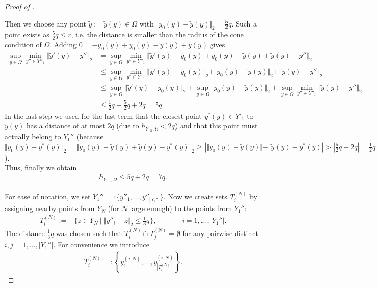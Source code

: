 \documentclass[a4paper, 10pt]{article}
\begin{document}
\begin{proof}[Proof of ]
\begin{itemize}
Then we choose any point $\tilde{y} := \tilde{y}(y) \in \Omega$ with $\Vert y_0(y) - \tilde{y}(y) \Vert_2 = \frac{5}{2} q$.
%
Such a point exists as $\frac{5}{2} q \leq r$, i.e. the distance is smaller than the radius of the cone condition of $\Omega$.
Adding $0 = - y_0(y) + y_0(y) - \tilde{y}(y) + \tilde{y}(y)$ gives
\begin{align*}
\sup_{y \in \Omega} \min_{y'' \in Y''_1}  \Vert \tilde{y}'(y) - y'' \Vert_2 
&= \sup_{y \in \Omega} \min_{y'' \in Y''_1}  \Vert \tilde{y}'(y) - y_0(y) + y_0(y) - \tilde{y}(y) + \tilde{y}(y) - y'' \Vert_2 \\
&\leq \sup_{y \in \Omega} \min_{y'' \in Y''_1}  \Vert \tilde{y}'(y) - y_0(y) \Vert_2 + \Vert y_0(y) - \tilde{y}(y) \Vert_2+ \Vert \tilde{y}(y) - y'' \Vert_2 \\
&\leq \sup_{y \in \Omega} \Vert \tilde{y}'(y) - y_0(y) \Vert_2 + \sup_{y \in \Omega} \Vert y_0(y) - \tilde{y}(y) \Vert_2 + \sup_{y \in \Omega} \min_{y'' \in Y''_1} \Vert \tilde{y}(y) - y'' \Vert_2 \\
&\leq \frac{1}{2} q + \frac{5}{2} q + 2q = 5q.
\end{align*}
In the last step we used for the last term that the closest point $y^*(y) \in Y'_1$ to $\tilde{y}(y)$ has a distance of at most $2q$ (due to $h_{Y'_1, \Omega} < 2q$) and that this point must actually belong to $Y_1''$ 
(because $\Vert y_0(y) - y^*(y) \Vert_2 = \Vert y_0(y) - \tilde{y}(y) + \tilde{y}(y) - y^*(y) \Vert_2 \geq \left| \Vert y_0(y) - \tilde{y}(y) \Vert - \Vert \tilde{y}(y) - y^*(y) \right| > |\frac{5}{2} q - 2q | = \frac{1}{2} q$). \\
Thus, finally we obtain
\begin{align*}
h_{Y_1'', \Omega} \leq 5q + 2q = 7q.
\end{align*}
\end{itemize}
For ease of notation, we set $Y_1'' =: \{y''_1, ..., y''_{|Y_1''|} \}$.
Now we create sets $T_i^{(N)}$ by assigning nearby points from $Y_N$ (for $N$ large enough) to the points from $Y_1''$:
\begin{align}
\label{eq:proof:definition_TiN}
T_i^{(N)} :=& \{ z \in Y_N ~ | ~ \Vert y''_i - z \Vert_2 \leq \frac{1}{3} q \}, \qquad &&i=1, ..., |Y_1''|.
\end{align}
The distance $\frac{1}{3}q$ was chosen such that $T_i^{(N)} \cap T_j^{(N)} = \emptyset$ for any pairwise distinct $i, j = 1, ..., |Y_1''|$. 
For convenience we introduce
\begin{align*}
T_i^{(N)} =: \left\{ y_1^{(i, N)}, ..., y_{|T_i^{(N)}|}^{(i, N)} \right\}.

\end{align*}
\end{proof}
\end{document}
